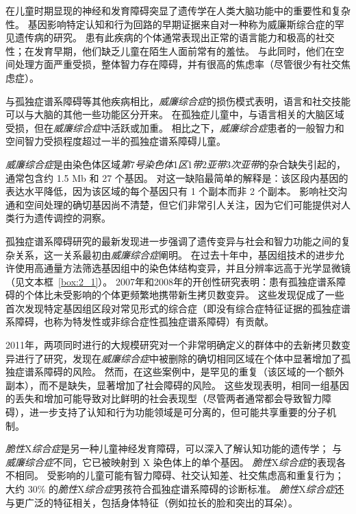 在儿童时期显现的神经和发育障碍突显了遗传学在人类大脑功能中的重要性和复杂性。
基因影响特定认知和行为回路的早期证据来自对一种称为威廉斯综合症的罕见遗传病的研究。
患有此疾病的个体通常表现出正常的语言能力和极高的社交性；在发育早期，他们缺乏儿童在陌生人面前常有的羞怯。
与此同时，他们在空间处理方面严重受损，整体智力存在障碍，并有很高的焦虑率（尽管很少有社交焦虑症）。


与孤独症谱系障碍等其他疾病相比，\textit{威廉综合症}的损伤模式表明，语言和社交技能可以与大脑的其他一些功能区分开来。
在孤独症儿童中，与语言相关的大脑区域受损，但在\textit{威廉综合症}中活跃或加重。
相比之下，\textit{威廉综合症}患者的一般智力和空间智力受损程度超过一半的孤独症谱系障碍儿童。


\textit{威廉综合症}是由染色体区域\textit{第}7\textit{号染色体}1\textit{区}1\textit{带}2\textit{亚带}3\textit{次亚带}的杂合缺失引起的，通常包含约 1.5 Mb 和 27 个基因。
对这一缺陷最简单的解释是：该区段内基因的表达水平降低，因为该区域的每个基因只有 1 个副本而非 2 个副本。
影响社交沟通和空间处理的确切基因尚不清楚，但它们非常引人关注，因为它们可能提供对人类行为遗传调控的洞察。


孤独症谱系障碍研究的最新发现进一步强调了遗传变异与社会和智力功能之间的复杂关系，这一关系最初由\textit{威廉综合症}阐明。
在过去十年中，基因组技术的进步允许使用高通量方法筛选基因组中的染色体结构变异，并且分辨率远高于光学显微镜（见文本框~\ref{box:2_1}）。
2007年和2008年的开创性研究表明：患有孤独症谱系障碍的个体比未受影响的个体更频繁地携带新生拷贝数变异。
这些发现促成了一些首次发现特定基因组区段对常见形式的综合症（即没有综合症特征证据的孤独症谱系障碍，也称为特发性或非综合症性孤独症谱系障碍）有贡献。


2011年，两项同时进行的大规模研究对一个非常明确定义的群体中的去新拷贝数变异进行了研究，发现在\textit{威廉综合症}中被删除的确切相同区域在个体中显著增加了孤独症谱系障碍的风险。
然而，在这些案例中，是罕见的重复（该区域的一个额外副本），而不是缺失，显著增加了社会障碍的风险。
这些发现表明，相同一组基因的丢失和增加可能导致对比鲜明的社会表现型（尽管两者通常都会导致智力障碍），进一步支持了认知和行为功能领域是可分离的，但可能共享重要的分子机制。


\textit{脆性}X\textit{综合症}是另一种儿童神经发育障碍，可以深入了解认知功能的遗传学；
与\textit{威廉综合症}不同，它已被映射到 X 染色体上的单个基因。
\textit{脆性}X\textit{综合症}的表现各不相同。
受影响的儿童可能有智力障碍、社交认知差、社交焦虑高和重复行为；
大约 30\% 的\textit{脆性}X\textit{综合症}男孩符合孤独症谱系障碍的诊断标准。
\textit{脆性}X\textit{综合症}还与更广泛的特征相关，包括身体特征（例如拉长的脸和突出的耳朵）。


